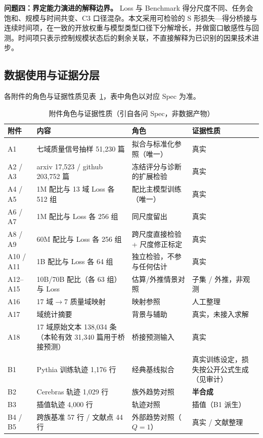 \textbf{问题四：界定能力演进的解释边界。} Loss 与 Benchmark 得分尺度不同、任务会饱和、规模与时间共变、C3 口径混杂。本文采用可检验的 S 形损失—得分桥接与连续时间项，在一致的开放权重与模型类型口径下分解增长，并做窗口敏感性与回测。时间项只表示控制规模状态后的剩余关联，不直接解释为已识别的因果技术进步。

\subsection{数据使用与证据分层}
\label{sec:2.3}

各附件的角色与证据性质见表~\ref{tab:attach}，表中角色以对应 Spec 为准。

\begin{table}[H]
\centering\footnotesize
\caption{附件角色与证据性质（引自各问 Spec，非数据产物）}
\label{tab:attach}
\begin{tabularx}{\textwidth}{@{}p{1.25cm}X p{3.8cm}p{3.05cm}@{}}
\toprule
附件 & 内容 & 角色 & 证据性质 \\
\midrule
A1 & 七域质量信号抽样 51,230 篇 & 拟合与标准化参照（唯一） & 真实 \\
A2 / A3 & arxiv 17,523 / github 203,752 篇 & 冻结评分与诊断的扩展检验 & 真实 \\
A4 / A5 & 1M 配比与 13 域 Loss 各 512 组 & 配比主模型训练（唯一） & 真实 \\
A6 / A7 & 1M 配比与 Loss 各 256 组 & 同尺度留出 & 真实 \\
A8 / A9 & 60M 配比与 Loss 各 256 组 & 跨尺度直接检验 + 尺度修正标定 & 真实 \\
A10 / A11 & 1B 配比与 Loss 各 64 组 & 独立检验，不参与任何估计 & 真实 \\
A12–A15 & 10B/70B 配比（各 63 组）与 Loss & 估算/外推情景对照 & 子集 / 外推，非观测 \\
A16 & 17 域$\to$7 质量域映射 & 映射参照 & 人工整理 \\
A17 & 域统计摘要 & 背景与辅助 & 真实，未接入求解 \\
A18 & 17 域原始文本 138,034 条（本轮有效 31,340 篇用于桥接预测） & 桥接预测输入 & 真实 \\
B1 & Pythia 训练轨迹 1,176 行 & 经典基线拟合 & 真实训练设定，损失按公开公式生成（见审计） \\
B2 & Cerebras 轨迹 1,029 行 & 族外趋势对照 & \textbf{半合成} \\
B3 & 插值轨迹 4,000 行 & 轨迹对照 & 插值（B1 派生） \\
B4 / B5 & 跨族基准 57 行 / 文献点 44 行 & 外部趋势对照（$Q=1$） & 真实 / 文献整理 \\

\end{tabularx}
\end{table}
